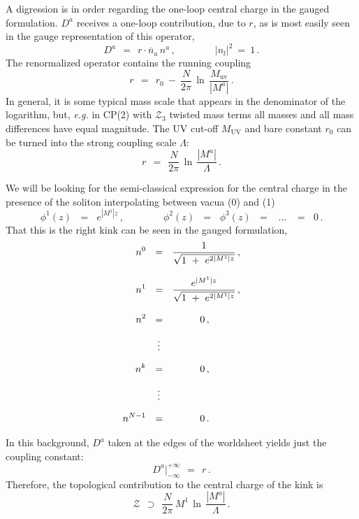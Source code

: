 \documentclass[epsfig,12pt]{article}
\def\beq{\begin{equation}}
\def\eeq{\end{equation}}
\def\beq{\begin{equation}}
\def\eeq{\end{equation}}
\newcommand{\ov}{\overline}
\newcommand{\mc}[1]{\mathcal{#1}}
\begin{document}
 
 
     
\newpage

A digression is in order regarding the one-loop central charge in the gauged formulation.
 $ D^a $ receives a one-loop contribution, due to $ r $, as is 
       most easily seen in the gauge representation of this operator,
\beq
       D^a  ~~=~~ r \cdot \ov{n}{}_a\, n^a \,,\qquad\qquad   | n_l |^2 ~=~ 1\,.
\eeq
       The renormalized operator contains the running coupling 
\beq
       r    ~~=~~ r_0  ~-~ \frac{N}{2\pi}\,\ln\, \frac{M_\text{uv}}
                                                      {   |M^a|   } \,.
\eeq
       In general, it is some typical mass scale that appears in the denominator of the logarithm, but, {\it e.g.}
       in CP(2) with $\mc{Z}_3$ twisted mass terms all masses and all mass differences have equal magnitude. 
       The UV cut-off $ M_\text{UV} $ and bare constant $ r_0 $ can be turned 
       into the strong coupling scale $ \Lambda $:
\beq
       r    ~~=~~ \frac{N}{2\pi}\, \ln\, \frac{   |M^a|   }
                                              {  \Lambda  }\,.
\eeq


       We will be looking for the semi-classical expression for the central charge in the presence
       of the soliton interpolating between vacua ({\sc \small 0}) and ({\sc \small 1})
\beq
       \phi^1(z)  \,~~=~~\, e^{|M^1| z}\,, \qquad\qquad  \phi^2(z) \,~~=~~\, \phi^3(z) \,~~=~~ \,~...~\, ~~=~~\, 0\,.
\eeq
       That this is the right kink can be seen in the gauged formulation,
\begin{align}
%
\notag
       n^0  & ~~=~~ \frac {             1              }
                          {\sqrt{ 1 ~+~ e^{2 |M^1| z} }}\,, \\[3mm]
%
\notag
       n^1  & ~~=~~ \frac {         e^{|M^1| z}        }
                          {\sqrt{ 1 ~+~ e^{2 |M^1| z} }}\,, \\[3mm]
%
\notag
       n^2  & ~~=~~ \qquad~~\, 0\,,  \\[2mm]
%	 
            & ~~~\,\vdots          \\[2mm]
%
\notag
       n^k  & ~~=~~ \qquad~~\, 0\,,  \\[2mm]
%	 
\notag
            & ~~~\,\vdots          \\[2mm]
%
\notag
       n^{N-1} & ~~=~~ \qquad~~\, 0\,.                
\end{align}

       In this background, $ D^a $ taken at the edges of the worldsheet yields just the coupling constant:
\beq
       D^a \Big|^{\scriptscriptstyle +\infty}_{\scriptscriptstyle -\infty} ~~=~~    r\,.
\eeq
       Therefore, the topological contribution to the central charge of the kink is
\beq
       \mc{Z} ~~\supset~~ \frac{N}{2\pi}\, M^1\, \ln\, \frac{   |M^a|   }
                                                            {  \Lambda  }\,.
\eeq
\end{document}
